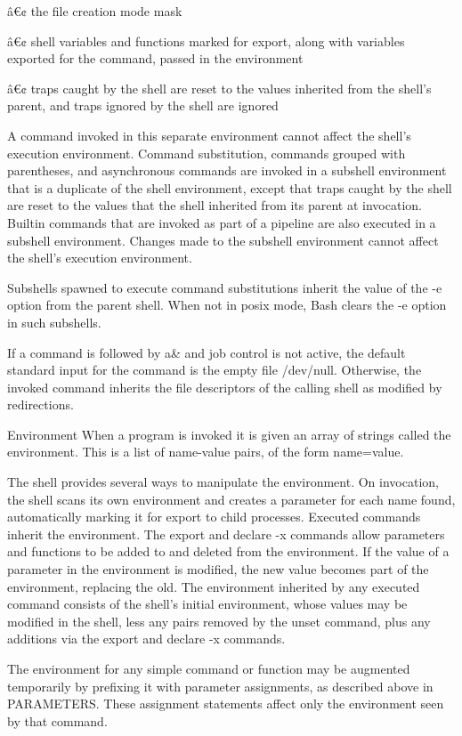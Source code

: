 \documentclass[11pt]{article}
\begin{document}
{{{â€¢ the file creation mode mask

â€¢ shell variables and functions marked for export, along with variables exported for the command, passed in the environment

â€¢ traps caught by the shell are reset to the values inherited from the shell's parent, and traps ignored by the shell are ignored

A command invoked in this separate environment cannot affect the shell's execution environment.
Command substitution, commands grouped with parentheses, and asynchronous commands are invoked in a subshell environment that is a duplicate of the shell environment, except that traps caught by the shell are reset to the values that the shell inherited from its parent at invocation. Builtin commands that are invoked as part of a pipeline are also executed in a subshell environment. Changes made to the subshell environment cannot affect the shell's execution environment.

Subshells spawned to execute command substitutions inherit the value of the -e option from the parent shell. When not in posix mode, Bash clears the -e option in such subshells.

If a command is followed by a\& and job control is not active, the default standard input for the command is the empty file /dev/null. Otherwise, the invoked command inherits the file descriptors of the calling shell as modified by redirections.

Environment
When a program is invoked it is given an array of strings called the environment. This is a list of name-value pairs, of the form name=value.

The shell provides several ways to manipulate the environment. On invocation, the shell scans its own environment and creates a parameter for each name found, automatically marking it for export to child processes. Executed commands inherit the environment. The export and declare -x commands allow parameters and functions to be added to and deleted from the environment. If the value of a parameter in the environment is modified, the new value becomes part of the environment, replacing the old. The environment inherited by any executed command consists of the shell's initial environment, whose values may be modified in the shell, less any pairs removed by the unset command, plus any additions via the export and declare -x commands.

The environment for any simple command or function may be augmented temporarily by prefixing it with parameter assignments, as described above in PARAMETERS. These assignment statements affect only the environment seen by that command.

}}}
\end{document}
